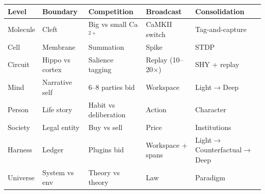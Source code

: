 \documentclass[11pt]{article}
\begin{document}
\begin{center}
\small
\begin{tabular}{p{2.2cm}p{2.6cm}p{2.6cm}p{2.6cm}p{3.0cm}}
\toprule
Level & Boundary & Competition & Broadcast & Consolidation \\
\midrule
Molecule & Cleft & Big vs small Ca$^{2+}$ & CaMKII switch & Tag-and-capture \\
Cell & Membrane & Summation & Spike & STDP \\
Circuit & Hippo vs cortex & Salience tagging & Replay (10--20$\times$) & SHY + replay \\
Mind & Narrative self & 6--8 parties bid & Workspace & Light$\to$Deep \\
Person & Life story & Habit vs deliberation & Action & Character \\
Society & Legal entity & Buy vs sell & Price & Institutions \\
Harness & Ledger & Plugins bid & Workspace + spans & Light$\to$Counterfactual$\to$Deep \\
Universe & System vs env & Theory vs theory & Law & Paradigm \\
\bottomrule
\end{tabular}
\end{center}
\end{document}
